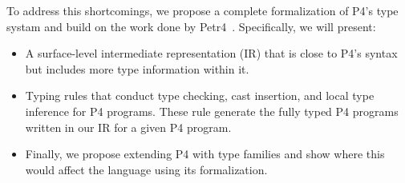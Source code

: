 \documentclass[11pt]{article}
\begin{document}
To address this shortcomings, we propose a complete formalization of P4's type systam and build on the work done by Petr4~\cite{petr4}.
Specifically, we will present:

\begin{itemize}
\item A surface-level intermediate representation (IR) that is  
close to P4's syntax but includes more type information within it. 
\item Typing rules that conduct type checking, cast insertion, and local type inference for P4 programs. These rule generate the fully typed P4 programs written in our IR for a given P4 program.
\item Finally, we propose extending P4 with type families and show where this would affect the language using its formalization.
\end{itemize}






%
%
\end{document}
